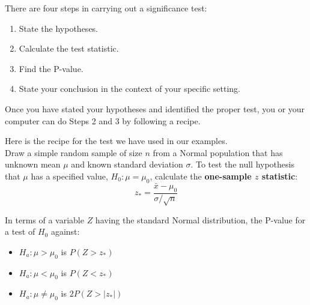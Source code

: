 \begin{tcolorbox}[title=\textbf{Tests for a Population Mean},
  colback=yellow!10,
  colframe=black!45,
  coltitle=black,
  fonttitle=\bfseries,
  breakable]

There are four steps in carrying out a significance test:
\begin{enumerate}
  \item State the hypotheses.
  \item Calculate the test statistic.
  \item Find the P-value.
  \item State your conclusion in the context of your specific setting.
\end{enumerate}

Once you have stated your hypotheses and identified the proper test, you or your computer can do Steps 2 and 3 by following a recipe. 

\end{tcolorbox}
\begin{tcolorbox}[title=\textbf{Z Test for a Population Mean ($\mu$)},
  colback=yellow!10,
  colframe=black!45,
  coltitle=black,
  fonttitle=\bfseries,
  breakable]

Here is the recipe for the test we have used in our examples.\\
Draw a simple random sample of size $n$ from a Normal population that has unknown mean $\mu$ and known standard deviation $\sigma$.
To test the null hypothesis that $\mu$ has a specified value, $H_0 : \mu = \mu_0$, calculate the \textbf{one-sample $z$ statistic}:
\[
z_\ast = \frac{\bar{x} - \mu_0}{\sigma / \sqrt{n}}
\]

In terms of a variable $Z$ having the standard Normal distribution, the P-value for a test of $H_0$ against:
\begin{itemize}
  \item $H_a: \mu > \mu_0$ is $P(Z > z_\ast)$
  \item $H_a: \mu < \mu_0$ is $P(Z < z_\ast)$
  \item $H_a: \mu \ne \mu_0$ is $2P(Z > |z_\ast|)$
\end{itemize}

\end{tcolorbox}
